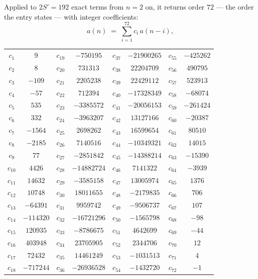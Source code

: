 \documentclass[11pt,a4paper]{article}
\theoremstyle{plain}
\theoremstyle{definition}
\begin{document}
Applied to $2S'=192$ exact terms from $n=2$ on, it returns order $72$ --- the
order the entry states --- with integer coefficients:
\[
a(n)\;=\;\sum_{i=1}^{72}c_i\,a(n-i),
\]
\begin{center}\small
\begin{tabular}{cccccccc}
$c_{1}$ & $9$ & $c_{19}$ & $-750195$ & $c_{37}$ & $-21900265$ & $c_{55}$ & $-425262$ \\
$c_{2}$ & $8$ & $c_{20}$ & $731313$ & $c_{38}$ & $22204709$ & $c_{56}$ & $490795$ \\
$c_{3}$ & $-109$ & $c_{21}$ & $2205238$ & $c_{39}$ & $22429112$ & $c_{57}$ & $523913$ \\
$c_{4}$ & $-57$ & $c_{22}$ & $712394$ & $c_{40}$ & $-17328349$ & $c_{58}$ & $-68074$ \\
$c_{5}$ & $535$ & $c_{23}$ & $-3385572$ & $c_{41}$ & $-20056153$ & $c_{59}$ & $-261424$ \\
$c_{6}$ & $332$ & $c_{24}$ & $-3963207$ & $c_{42}$ & $13127166$ & $c_{60}$ & $-20387$ \\
$c_{7}$ & $-1564$ & $c_{25}$ & $2698262$ & $c_{43}$ & $16599654$ & $c_{61}$ & $80510$ \\
$c_{8}$ & $-2185$ & $c_{26}$ & $7140516$ & $c_{44}$ & $-10349321$ & $c_{62}$ & $14015$ \\
$c_{9}$ & $77$ & $c_{27}$ & $-2851842$ & $c_{45}$ & $-14388214$ & $c_{63}$ & $-15390$ \\
$c_{10}$ & $4426$ & $c_{28}$ & $-14882724$ & $c_{46}$ & $7141322$ & $c_{64}$ & $-3939$ \\
$c_{11}$ & $14632$ & $c_{29}$ & $-3585158$ & $c_{47}$ & $13005974$ & $c_{65}$ & $1376$ \\
$c_{12}$ & $10748$ & $c_{30}$ & $18011655$ & $c_{48}$ & $-2179835$ & $c_{66}$ & $706$ \\
$c_{13}$ & $-64391$ & $c_{31}$ & $9959742$ & $c_{49}$ & $-9506737$ & $c_{67}$ & $107$ \\
$c_{14}$ & $-114320$ & $c_{32}$ & $-16721296$ & $c_{50}$ & $-1565798$ & $c_{68}$ & $-98$ \\
$c_{15}$ & $120935$ & $c_{33}$ & $-8786675$ & $c_{51}$ & $4642699$ & $c_{69}$ & $-44$ \\
$c_{16}$ & $403948$ & $c_{34}$ & $23705905$ & $c_{52}$ & $2344706$ & $c_{70}$ & $12$ \\
$c_{17}$ & $72432$ & $c_{35}$ & $14461249$ & $c_{53}$ & $-1031513$ & $c_{71}$ & $4$ \\
$c_{18}$ & $-717244$ & $c_{36}$ & $-26936528$ & $c_{54}$ & $-1432720$ & $c_{72}$ & $-1$ \\
\end{tabular}
\end{center}
\end{document}
